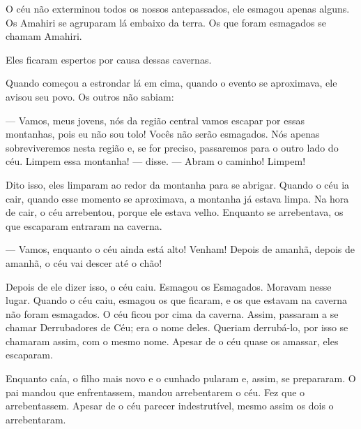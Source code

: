 
O céu não exterminou todos os nossos antepassados, ele esmagou apenas alguns. Os
Amahiri se agruparam lá embaixo da terra. Os que foram esmagados se
chamam Amahiri. 


Eles ficaram espertos por causa dessas cavernas.

Quando começou a estrondar lá em cima, quando o evento se
aproximava, ele avisou seu povo. Os outros não sabiam:

--- Vamos, meus jovens, nós da região central vamos escapar por essas
montanhas, pois eu não sou tolo! Vocês não serão esmagados. Nós apenas
sobreviveremos nesta região e, se for preciso, passaremos para o outro lado
do céu. Limpem essa montanha! --- disse. --- Abram o caminho! Limpem! 

Dito isso, eles limparam ao redor da montanha para se abrigar. Quando o
céu ia cair, quando esse momento se aproximava, a montanha já estava
limpa. Na hora de cair, o céu arrebentou, porque ele estava velho.
Enquanto se arrebentava, os que escaparam entraram na caverna. 

--- Vamos, enquanto o céu ainda está alto! Venham! Depois de amanhã,
depois de amanhã, o céu vai descer até o chão! 

Depois de ele dizer isso, o céu caiu. Esmagou os Esmagados. Moravam
nesse lugar. Quando o céu caiu, esmagou os que ficaram, e os que estavam
na caverna não foram esmagados. O céu ficou por cima da caverna. Assim,
passaram a se chamar Derrubadores de Céu; era o nome deles. Queriam
derrubá-lo, por isso se chamaram assim, com o mesmo nome. Apesar de o
céu quase os amassar, eles escaparam. 

Enquanto caía, o filho mais novo e o cunhado pularam e, assim, se
prepararam. O pai mandou que enfrentassem, mandou arrebentarem o céu. Fez
que o arrebentassem. Apesar de o céu parecer indestrutível, mesmo assim
os dois o arrebentaram. 

